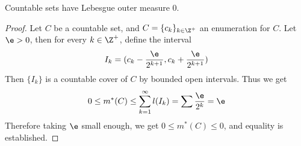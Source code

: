 \begin{lemma}\label{8.2.3}
    Countable sets have Lebesgue outer measure $0$.
\end{lemma}
\begin{proof}
    Let $C$ be a countable set, and  $C=\{c_k\}_{k \in \Z^+}$ an enumeration for
    $C$. Let $\e>0$, then for every  $k \in \Z^+$, define the interval
    \begin{equation*}
        I_k=(c_k-\frac{\e}{2^{k+1}}, c_k+\frac{\e}{2^{k+1}})
    \end{equation*}
    Then $\{I_k\}$ is a countable cover of $C$ by bounded open intervals. Thus
    we get
    \begin{equation*}
        0 \leq m^\ast(C) \leq \sum_{k=1}^\infty{l(I_k)}=\sum{\frac{\e}{2^k}}=\e
    \end{equation*}
    Therefore taking $\e$ small enough, we get  $0 \leq m^\ast(C) \leq 0$, and
    equality is established.
\end{proof}

